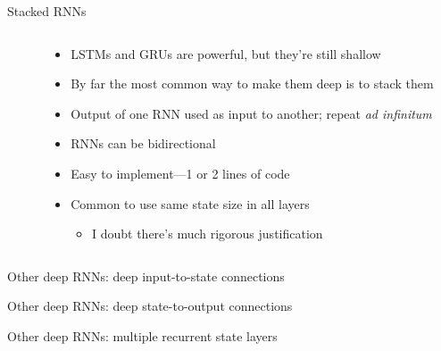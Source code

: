 \begin{frame}{Stacked RNNs}
    \begin{columns}
        \begin{column}{0.41\textwidth}
            
        \end{column}
        \begin{column}{0.59\textwidth}
            \begin{itemize}
                \item LSTMs and GRUs are powerful, but they're still shallow
                \item By far the most common way to make them deep is to \alert{stack} them
                \item Output of one RNN used as input to another; repeat \emph{ad infinitum}
                \pause
                \item RNNs can be bidirectional
                \item Easy to implement---1 or 2 lines of code
                \item Common to use same state size in all layers
                \begin{itemize}
                    \item I doubt there's much rigorous justification
                \end{itemize}
            \end{itemize}
        \end{column}
    \end{columns}
\end{frame}

\begin{frame}{Other deep RNNs: deep input-to-state connections}
    \hspace{2cm}
    
    
\end{frame}

\begin{frame}{Other deep RNNs: deep state-to-output connections}
    \hspace{2cm}
    
    
\end{frame}

\begin{frame}{Other deep RNNs: multiple recurrent state layers \citep{GravesICASSP13}}
    \hspace{2cm}
    
    
\end{frame}

